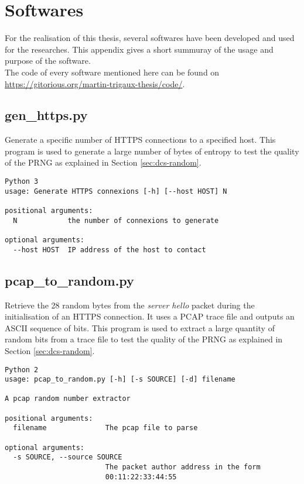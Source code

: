 
\chapter{Softwares}
\label{chap:app-soft}

For the realisation of this thesis, several softwares have been developed and used for the researches.
This appendix gives a short summuray of the usage and purpose of the software.\\

The code of every software mentioned here can be found on \url{https://gitorious.org/martin-trigaux-thesis/code/}.

\section{gen\_https.py}

Generate a specific number of HTTPS connections to a specified host.
This program is used to generate a large number of bytes of entropy to test the quality of the PRNG as explained in Section \ref{sec:dcs-random}.

\begin{verbatim}
Python 3 
usage: Generate HTTPS connexions [-h] [--host HOST] N

positional arguments:
  N            the number of connexions to generate

optional arguments:
  --host HOST  IP address of the host to contact
\end{verbatim}

\section{pcap\_to\_random.py}

Retrieve the 28 random bytes from the \emph{server hello} packet during the initialisation of an HTTPS connection.
It uses a PCAP trace file and outputs an ASCII sequence of bits.
This program is used to extract a large quantity of random bits from a trace file to test the quality of the PRNG as explained in Section \ref{sec:dcs-random}.

\begin{verbatim}
Python 2
usage: pcap_to_random.py [-h] [-s SOURCE] [-d] filename

A pcap random number extractor

positional arguments:
  filename              The pcap file to parse

optional arguments:
  -s SOURCE, --source SOURCE
                        The packet author address in the form
                        00:11:22:33:44:55
\end{verbatim}